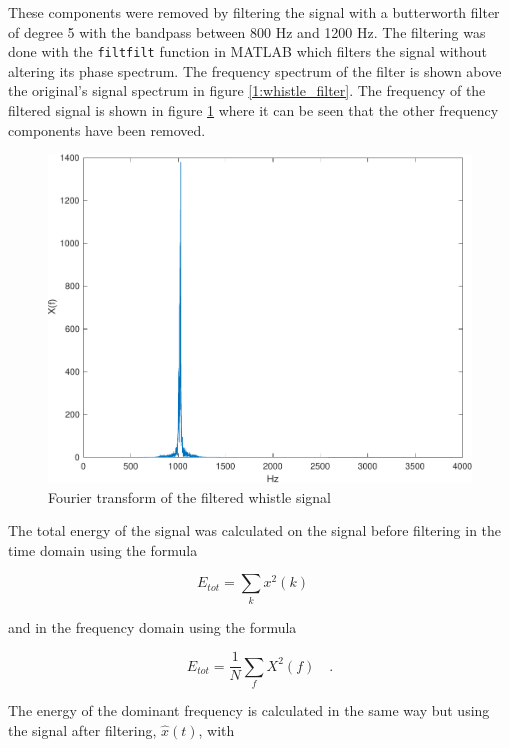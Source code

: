 \documentclass{IEEEtran}
\newcommand{\code}[1]{\texttt{#1}}
\begin{document}
These components were removed by filtering the signal with a butterworth
filter of degree 5 with the bandpass between 800 Hz and 1200 Hz. The
filtering was done with the \code{filtfilt} function in MATLAB which filters
the signal without altering its phase spectrum. The frequency spectrum
of the filter is shown above the original's signal spectrum in figure
\ref{1:whistle_filter}. The frequency of the filtered signal is shown
in figure \ref{1:whistle_clean} where it can be seen that the other
frequency components have been removed.

\begin{figure}[h]
  \centering
  \captionsetup{justification=centering}

  \includegraphics[width=0.8\columnwidth]{pictures/whistle_clean.pdf}
  \caption{Fourier transform of the filtered whistle signal}
  \label{1:whistle_clean}

\end{figure}

The total energy of the signal was calculated on the signal before filtering
in the time domain using the formula

\begin{equation}
  E_{tot} = \sum_k{x^2(k)} \quad
\end{equation}

and in the frequency domain using the formula

\begin{equation}
  E_{tot} = \frac{1}{N}\sum_f{X^2(f)} \quad .
\end{equation}

The energy of the dominant frequency is calculated in the same way but
using the signal after filtering, $\hat{x}(t)$, with
\end{document}
